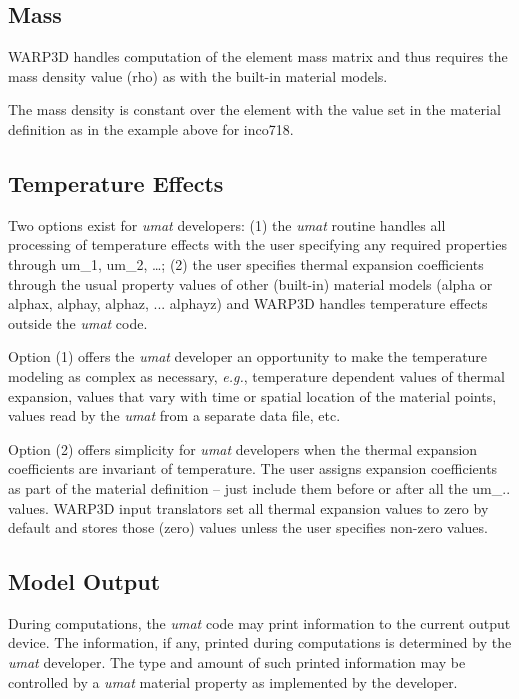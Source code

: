 \documentclass[11pt]{report}
\numberwithin{equation}{section}
\newcommand{\eg}{\emph{e.g.},\xspace}
\newcommand{\ti}{\emph}
\newcommand{\umat}{\ti{umat}\xspace}
\newcounter{sect

s}
\begin{document}
\subsection {Mass}

\noindent WARP3D handles computation of the element mass matrix and thus
requires the mass density value (rho) as with the built-in material
models.

The mass density is constant over the element with the value
set in the material definition as in the example above for 
inco718.


\subsection {Temperature Effects}

\noindent Two options exist for \umat developers: (1) the \umat
routine handles all processing of temperature effects with the
user specifying any required properties through
um\_1, um\_2, \dots; (2) the user specifies 
thermal expansion coefficients through the usual
property values of other (built-in) material models (alpha or alphax,
alphay, alphaz, ... alphayz) and WARP3D handles temperature
effects outside the \umat code. 

Option (1) offers the \umat developer an opportunity to 
make the temperature modeling as complex as necessary,
\eg temperature dependent values of thermal
expansion, values that vary with time or spatial
location of the material points, values read by the 
\umat from a separate data file, etc. 

Option (2) offers simplicity for \umat
developers when the thermal expansion coefficients are
invariant of temperature. The user assigns expansion 
coefficients as part of the material definition -- just include them
before or after all the um\_.. values. WARP3D input translators
set all thermal expansion values to zero by default and stores those
(zero) values unless the user specifies non-zero values.

\subsection {Model Output}
During computations, the \umat code may print information
to the current output device. The information, if any,
printed during computations is determined by the \umat
developer. The type and amount of such printed information
may be controlled by a \umat material property
as implemented by the developer.
\end{document}
